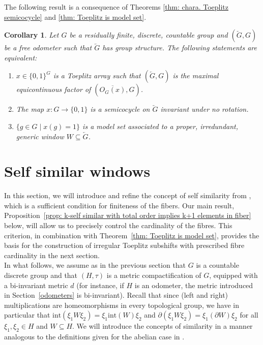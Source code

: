 \documentclass[titlepage,reqno,10pt]{amsart}
\newtheorem{corollary}[theorem]{Corollary}
\theoremstyle{definition}
\newcommand{\tm}{\subseteq}
\begin{document}
The following result is a consequence of Theorems  \ref{thm: chara. Toeplitz semicocycle} and \ref{thm: Toeplitz is model set}.
\begin{corollary}
  Let $G$ be a residually finite, discrete, countable group and $(\overleftarrow{G},G)$ be a free odometer such that $\overleftarrow{G}$ has group structure. The following statements are equivalent:
\begin{enumerate}
\item $x\in\{0,1\}^G$ is a Toeplitz array such that $(\overleftarrow{G},G)$ is the maximal e\-qui\-con\-ti\-nuous factor of $(\overline{O_G(x)},G)$.

\item The map $x:G\to \{0,1\}$ is a semicocycle on $\overleftarrow{G}$   invariant under no rotation.

\item $\{g \in G \mid x(g)=1\}$ is a model set associated to a proper, irredundant, generic window $W\subseteq \overleftarrow{G}$.
\end{enumerate}
\end{corollary}

\section{Self similar windows}\label{sec: self similarity}
In this section, we will introduce and refine the concept of self similarity from \cite[Section 4.1]{FuGlJäOe21}, which is a sufficient condition for finiteness of the fibers. Our main result, Proposition~\ref{prop: k-self similar with total order implies k+1 elements in fiber} below, will allow us to precisely control the cardinality of the fibres. This criterion, in combination with Theorem~\ref{thm: Toeplitz is model set}, provides the basis for the construction of irregular Toeplitz subshifts with prescribed fibre cardinality in the next section.\\
In what follows, we assume as in the previous section that $G$ is a countable discrete group and that $(H,\tau)$ is a metric compactification of $G$, equipped with a bi-invariant metric $d$ (for instance, if $H$ is an odometer,  the metric introduced in Section~\ref{odometers} is bi-invariant). 
Recall that since (left and right) multiplications are homeomorphisms in every topological group, we have in particular that $\mathrm{int}(\xi_1 W \xi_2) = \xi_1\mathrm{int}(W)\xi_2$ and $\partial(\xi_1W\xi_2) = \xi_1 (\partial W) \xi_2$ for all $\xi_1,\xi_2\in H$ and $W\tm H$. We will introduce the concepts of similarity in a manner analogous to the definitions given for the abelian case in \cite{FuGlJäOe21}.  \medskip
\end{document}
